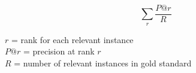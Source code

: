 \begin{flushleft}
\begin{equation}
  \sum_{r}\nolimits \frac{P@r}{R}
\end{equation}

$r$ = rank for each relevant instance\\
$P@r$ = precision at rank $r$\\
$R$ = number of relevant instances in gold standard\\

\end{flushleft}
%
